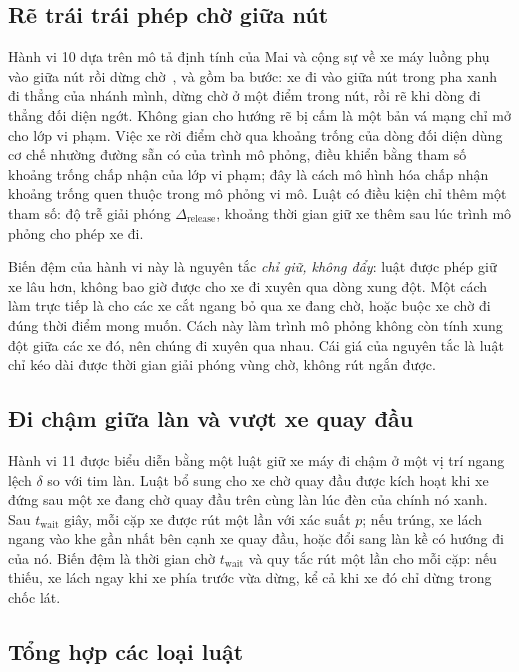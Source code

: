 \documentclass[../main.tex]{subfiles}
\begin{document}
\subsection{Rẽ trái trái phép chờ giữa nút}

Hành vi 10 dựa trên mô tả định tính của Mai và cộng sự về xe máy luồng phụ vào giữa nút rồi dừng chờ~\cite{mai2019signal}, và gồm ba bước: xe đi vào giữa nút trong pha xanh đi thẳng của nhánh mình, dừng chờ ở một điểm trong nút, rồi rẽ khi dòng đi thẳng đối diện ngớt. Không gian cho hướng rẽ bị cấm là một bản vá mạng chỉ mở cho lớp vi phạm. Việc xe rời điểm chờ qua khoảng trống của dòng đối diện dùng cơ chế nhường đường sẵn có của trình mô phỏng, điều khiển bằng tham số khoảng trống chấp nhận của lớp vi phạm; đây là cách mô hình hóa chấp nhận khoảng trống quen thuộc trong mô phỏng vi mô. Luật có điều kiện chỉ thêm một tham số: độ trễ giải phóng $\Delta_{\text{release}}$, khoảng thời gian giữ xe thêm sau lúc trình mô phỏng cho phép xe đi.

Biến đệm của hành vi này là nguyên tắc \emph{chỉ giữ, không đẩy}: luật được phép giữ xe lâu hơn, không bao giờ được cho xe đi xuyên qua dòng xung đột. Một cách làm trực tiếp là cho các xe cắt ngang bỏ qua xe đang chờ, hoặc buộc xe chờ đi đúng thời điểm mong muốn. Cách này làm trình mô phỏng không còn tính xung đột giữa các xe đó, nên chúng đi xuyên qua nhau. Cái giá của nguyên tắc là luật chỉ kéo dài được thời gian giải phóng vùng chờ, không rút ngắn được.

\subsection{Đi chậm giữa làn và vượt xe quay đầu}

Hành vi 11 được biểu diễn bằng một luật giữ xe máy đi chậm ở một vị trí ngang lệch $\delta$ so với tim làn. Luật bổ sung cho xe chờ quay đầu được kích hoạt khi xe đứng sau một xe đang chờ quay đầu trên cùng làn lúc đèn của chính nó xanh. Sau $t_{\text{wait}}$ giây, mỗi cặp xe được rút một lần với xác suất $p$; nếu trúng, xe lách ngang vào khe gần nhất bên cạnh xe quay đầu, hoặc đổi sang làn kề có hướng đi của nó. Biến đệm là thời gian chờ $t_{\text{wait}}$ và quy tắc rút một lần cho mỗi cặp: nếu thiếu, xe lách ngay khi xe phía trước vừa dừng, kể cả khi xe đó chỉ dừng trong chốc lát.

\subsection{Tổng hợp các loại luật}
\end{document}
